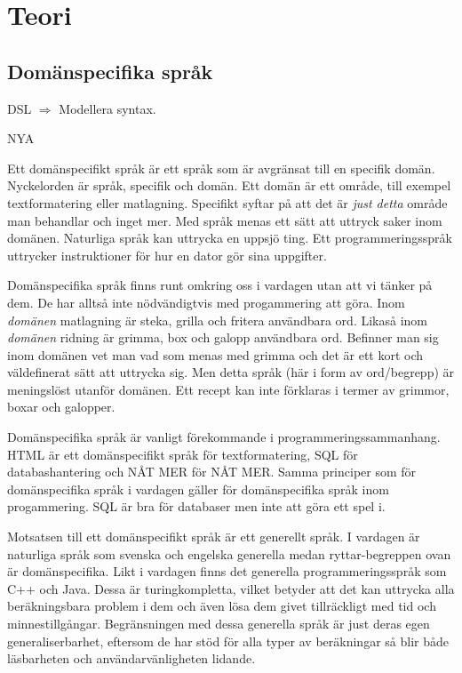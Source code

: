 
\chapter{Teori}

\section{Domänspecifika språk}
\begin{binge}
DSL $\Rightarrow$ Modellera syntax.
\end{binge}
\begin{draft}

NYA

Ett domänspecifikt språk är ett språk som är avgränsat till en specifik domän. Nyckelorden är språk, specifik och domän. Ett domän är ett område, till exempel textformatering eller matlagning. Specifikt syftar på att det är \textit{just detta} område man behandlar och inget mer. Med språk menas ett sätt att uttryck saker inom domänen. Naturliga språk kan uttrycka en uppsjö ting. Ett programmeringsspråk uttrycker instruktioner för hur en dator gör sina uppgifter.

Domänspecifika språk finns runt omkring oss i vardagen utan att vi tänker på dem. De har alltså inte nödvändigtvis med progammering att göra. Inom \textit{domänen} matlagning är steka, grilla och fritera användbara ord. Likaså inom \textit{domänen} ridning är grimma, box och galopp användbara ord. Befinner man sig inom domänen vet man vad som menas med grimma och det är ett kort och väldefinerat sätt att uttrycka sig. Men detta språk (här i form av ord/begrepp) är meningslöst utanför domänen. Ett recept kan inte förklaras i termer av grimmor, boxar och galopper.

Domänspecifika språk är vanligt förekommande i programmeringssammanhang. HTML är ett domänspecifikt språk för textformatering, SQL för databashantering och NÅT MER för NÅT MER. Samma principer som för domänspecifika språk i vardagen gäller för domänspecifika språk inom progammering. SQL är bra för databaser men inte att göra ett spel i.

Motsatsen till ett domänspecifikt språk är ett generellt språk. I vardagen är naturliga språk som svenska och engelska generella medan ryttar-begreppen ovan är domänspecifika. Likt i vardagen finns det generella programmeringsspråk som C++ och Java. Dessa är turingkompletta, vilket betyder att det kan uttrycka alla beräkningsbara problem i dem och även lösa dem givet tillräckligt med tid och  minnestillgångar. Begränsningen med dessa generella språk är just deras egen generaliserbarhet, eftersom de har stöd för alla typer av beräkningar så blir både läsbarheten och användarvänligheten lidande.


\end{draft}
